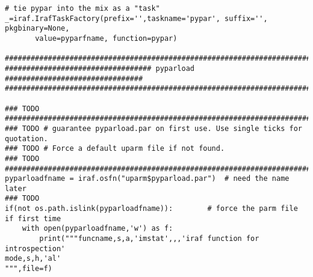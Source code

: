 {\begin{verbatim}
# tie pypar into the mix as a "task"
_=iraf.IrafTaskFactory(prefix='',taskname='pypar', suffix='', pkgbinary=None,
       value=pyparfname, function=pypar)

#############################################################################
################################## pyparload ################################
#############################################################################

### TODO #############################################################################
### TODO # guarantee pyparload.par on first use. Use single ticks for quotation.
### TODO # Force a default uparm file if not found.
### TODO #############################################################################
pyparloadfname = iraf.osfn("uparm$pyparload.par")  # need the name later
### TODO
if(not os.path.islink(pyparloadfname)):        # force the parm file if first time
    with open(pyparloadfname,'w') as f:
        print("""funcname,s,a,'imstat',,,'iraf function for introspection'
mode,s,h,'al'
""",file=f)


\end{verbatim}}
